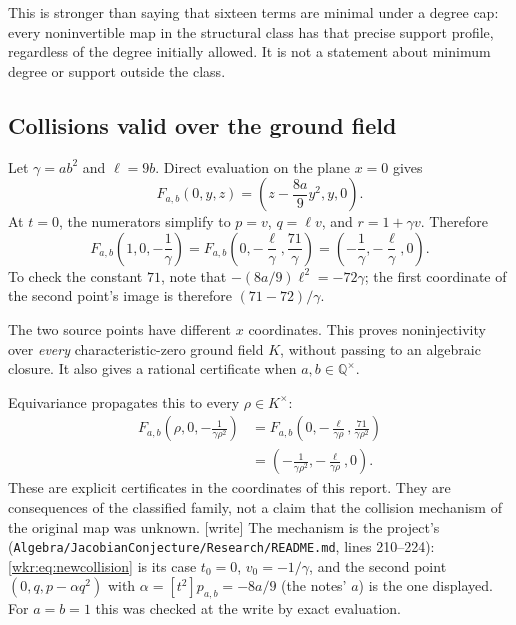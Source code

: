\documentclass[11pt,a4paper]{article}
\numberwithin{equation}{section}
\theoremstyle{definition}
\theoremstyle{remark}
\newcommand{\Q}{\mathbb{Q}}
\newcommand{\wtag}{\textup{[write]}}%
\newcommand{\rpath}[1]{\nolinkurl{#1}}
\begin{document}
This is stronger than saying that sixteen terms are minimal under a degree
cap: every noninvertible map in the structural class has that precise
support profile, regardless of the degree initially allowed. It is not a
statement about minimum degree or support outside the class.

\subsection{Collisions valid over the ground field}

Let $\gamma=ab^2$ and $\ell=9b$. Direct evaluation on the plane $x=0$
gives
\begin{equation}\label{wkr:eq:xzero}
F_{a,b}(0,y,z)=\left(z-\frac{8a}{9}y^2,y,0\right).
\end{equation}
At $t=0$, the numerators simplify to $p=v$, $q=\ell v$, and
$r=1+\gamma v$. Therefore
\begin{equation}\label{wkr:eq:newcollision}
F_{a,b}\left(1,0,-\frac1\gamma\right)
=F_{a,b}\left(0,-\frac\ell\gamma,\frac{71}\gamma\right)
=\left(-\frac1\gamma,-\frac\ell\gamma,0\right).
\end{equation}
To check the constant $71$, note that
$-(8a/9)\ell^2=-72\gamma$; the first coordinate of the second point's
image is therefore $(71-72)/\gamma$.

The two source points have different $x$ coordinates. This proves
noninjectivity over \emph{every} characteristic-zero ground field $K$,
without passing to an algebraic closure. It also gives a rational
certificate when $a,b\in\Q^\times$.

Equivariance propagates this to every $\rho\in K^\times$:
\begin{equation}\label{wkr:eq:collisionfamily}
\begin{aligned}
F_{a,b}\left(\rho,0,-\frac1{\gamma\rho^2}\right)
&=F_{a,b}\left(0,-\frac\ell{\gamma\rho},
                         \frac{71}{\gamma\rho^2}\right)\\
&=\left(-\frac1{\gamma\rho^2},-\frac\ell{\gamma\rho},0\right).
\end{aligned}
\end{equation}
These are explicit certificates in the coordinates of this report. They
are consequences of the classified family, not a claim that the collision
mechanism of the original map was unknown.
\wtag{} The mechanism is the project's
(\rpath{Algebra/JacobianConjecture/Research/README.md}, lines 210--224):
\eqref{wkr:eq:newcollision} is its case $t_0=0$, $v_0=-1/\gamma$, and the
second point $(0,q,p-\alpha q^2)$ with $\alpha=[t^2]p_{a,b}=-8a/9$ (the
notes' $a$) is the one displayed. For $a=b=1$ this was checked at the write by exact evaluation.
\end{document}
